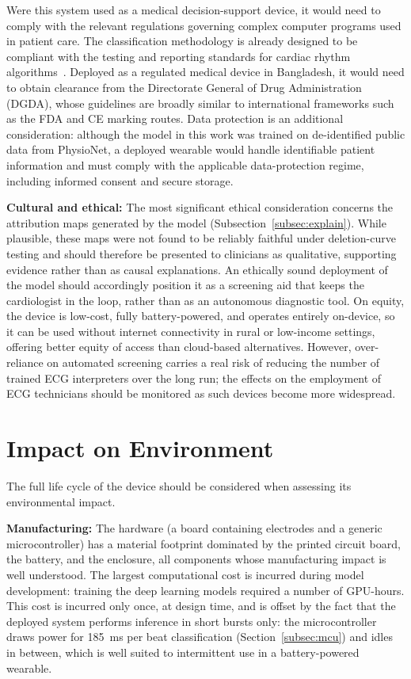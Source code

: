 Were this system used as a medical decision-support device, it would need
to comply with the relevant regulations governing complex computer
programs used in patient care. The classification methodology is already
designed to be compliant with the testing and reporting standards for
cardiac rhythm algorithms~\cite{aami_ec57_2012}. Deployed as a regulated
medical device in Bangladesh, it would need to obtain clearance from the
Directorate General of Drug Administration (DGDA), whose guidelines are
broadly similar to international frameworks such as the FDA and CE
marking routes. Data protection is an additional consideration: although
the model in this work was trained on de-identified public data from
PhysioNet, a deployed wearable would handle identifiable patient
information and must comply with the applicable data-protection regime,
including informed consent and secure storage.

\textbf{Cultural and ethical:} The most significant ethical
consideration concerns the attribution maps generated by the model
(Subsection~\ref{subsec:explain}). While plausible, these maps were not
found to be reliably faithful under deletion-curve testing and should
therefore be presented to clinicians as qualitative, supporting evidence
rather than as causal explanations. An ethically sound deployment of the
model should accordingly position it as a screening aid that keeps the
cardiologist in the loop, rather than as an autonomous diagnostic tool.
On equity, the device is low-cost, fully battery-powered, and operates
entirely on-device, so it can be used without internet connectivity in
rural or low-income settings, offering better equity of access than
cloud-based alternatives. However, over-reliance on automated screening
carries a real risk of reducing the number of trained ECG interpreters
over the long run; the effects on the employment of ECG technicians
should be monitored as such devices become more widespread.

\section{Impact on Environment}
\label{sec:environment}

The full life cycle of the device should be considered when assessing its
environmental impact.

\textbf{Manufacturing:} The hardware (a board containing electrodes and
a generic microcontroller) has a material footprint dominated by the
printed circuit board, the battery, and the enclosure, all components
whose manufacturing impact is well understood. The largest computational
cost is incurred during model development: training the deep learning
models required a number of GPU-hours. This cost is incurred only once,
at design time, and is offset by the fact that the deployed system
performs inference in short bursts only: the microcontroller draws power
for 185~ms per beat classification (Section~\ref{subsec:mcu}) and idles in
between, which is well suited to intermittent use in a battery-powered
wearable.

